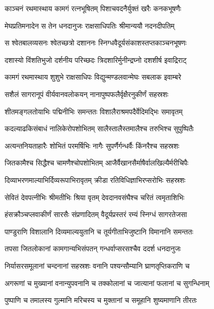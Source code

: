 \twolineshloka
{काञ्चनं रथमास्थाय कामगं रत्नभूषितम्}
{पिशाचवदनैर्युक्तं खरैः कनकभूषणैः} %

\twolineshloka
{मेघप्रतिमनादेन स तेन धनदानुजः}
{राक्षसाधिपतिः श्रीमान्ययौ नदनदीपतिम्} %

\twolineshloka
{स श्वेतबालव्यसनः श्वेतच्छत्रो दशाननः}
{स्निग्धवैदूर्यसंकाशस्तप्तकाञ्चनभूषणः} %

\twolineshloka
{दशास्यो विंशतिभुजो दर्शनीय परिच्छदः}
{त्रिदशारिर्मुनीन्द्रघ्नो दशशीर्ष इवाद्रिराट्} %

\twolineshloka
{कामगं रथमास्थाय शुशुभे राक्षसाधिपः}
{विद्युन्मण्डलवान्मेघः सबलाक इवाम्बरे} %

\twolineshloka
{सशैलं सागरानूपं वीर्यवानवलोकयन्}
{नानापुष्पफलैर्वृक्षैरनुकीर्णं सहस्रशः} %

\twolineshloka
{शीतमङ्गलतोयाभिः पद्मिनीभिः समन्ततः}
{विशालैराश्रमपदैर्वेदिमद्भिः समावृतम्} %

\twolineshloka
{कदल्याढकिसंबाधं नालिकेरोपशोभितम्}
{सालैस्तालैस्तमालैश्च तरुभिश्च सुपुष्पितैः} %

\twolineshloka
{अत्यन्तनियताहारैः शोभितं परमर्षिभिः}
{नागैः सुपर्णैर्गन्धर्वैः किंनरैश्च सहस्रशः} %

\twolineshloka
{जितकामैश्च सिद्धैश्च चामणैश्चोपशोभितम्}
{आजैर्वैखानसैर्माषैर्वालखिल्यैर्मरीचिपैः} %

\twolineshloka
{दिव्याभरणमाल्याभिर्दिव्यरूपाभिरावृतम्}
{क्रीडा रतिविधिज्ञाभिरप्सरोभिः सहस्रशः} %

\twolineshloka
{सेवितं देवपत्नीभिः श्रीमतीभिः श्रिया वृतम्}
{देवदानवसंघैश्च चरितं त्वमृताशिभिः} %

\twolineshloka
{हंसक्रौञ्चप्लवाकीर्णं सारसैः संप्रणादितम्}
{वैदूर्यप्रस्तरं रम्यं स्निग्धं सागरतेजसा} %

\twolineshloka
{पाण्डुराणि विशालानि दिव्यमाल्ययुतानि च}
{तूर्यगीताभिजुष्टानि विमानानि समन्ततः} %

\twolineshloka
{तपसा जितलोकानां कामगान्यभिसंपतन्}
{गन्धर्वाप्सरसश्चैव ददर्श धनदानुजः} %

\twolineshloka
{निर्यासरसमूलानां चन्दनानां सहस्रशः}
{वनानि पश्यन्सौम्यानि घ्राणतृप्तिकराणि च} %

\twolineshloka
{अगरूणां च मुख्यानां वनान्युपवनानि च}
{तक्कोलानां च जात्यानां फलानां च सुगन्धिनाम्} %

\twolineshloka
{पुष्पाणि च तमालस्य गुल्मानि मरिचस्य च}
{मुक्तानां च समूहानि शुष्यमाणानि तीरतः} %

